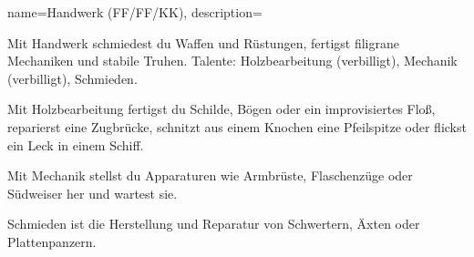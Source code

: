{
    name={Handwerk (FF/FF/KK)},
    description={Mit Handwerk schmiedest du Waffen und Rüstungen, fertigst filigrane Mechaniken und stabile Truhen. Talente: Holzbearbeitung (verbilligt), Mechanik (verbilligt), Schmieden.
\begin{description}
\item Mit Holzbearbeitung fertigst du Schilde, Bögen oder ein improvisiertes Floß, reparierst eine Zugbrücke, schnitzt aus einem Knochen eine Pfeilspitze oder flickst ein Leck in einem Schiff.
\item Mit Mechanik stellst du Apparaturen wie Armbrüste, Flaschenzüge oder Südweiser her und wartest sie.
\item Schmieden ist die Herstellung und Reparatur von Schwertern, Äxten oder Plattenpanzern.
\end{description}}}
